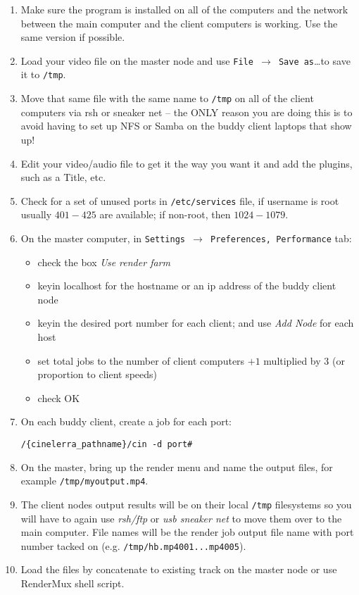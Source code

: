 \begin{enumerate}
\item Make sure the \CGG{} program is installed on all of the
  computers and the network between the main computer and the client
  computers is working.  Use the same version if possible.
\item Load your video file on the master node and use \texttt{File
    $\rightarrow$ Save as}\dots to save it to \texttt{/tmp}.
\item Move that same file with the same name to \texttt{/tmp} on all
  of the client computers via rsh or sneaker net -- the ONLY reason
  you are doing this is to avoid having to set up NFS or Samba on the
  buddy client laptops that show up!
\item Edit your video/audio file to get it the way you want it and
  add the plugins, such as a Title, etc.
\item Check for a set of unused ports in \texttt{/etc/services}
  file, if username is root usually $401-425$ are available; if
  non-root, then $1024-1079$.
\item On the master computer, in \texttt{Settings $\rightarrow$
    Preferences, Performance} tab:
  \begin{itemize}
  \item check the box \textit{Use render farm}
  \item keyin localhost for the hostname or an ip address of the
    buddy client node
  \item keyin the desired port number for each client; and use
    \textit{Add Node} for each host
  \item set total jobs to the number of client computers $+1$
    multiplied by $3$ (or proportion to client speeds)
  \item check OK
  \end{itemize}
\item On each buddy client, create a job for each port:
\begin{lstlisting}[style=sh]
/{cinelerra_pathname}/cin -d port#
\end{lstlisting}
\item On the master, bring up the render menu and name the output
  files, for example \texttt{/tmp/myoutput.mp4}.
\item The client nodes output results will be on their local
  \texttt{/tmp} filesystems so you will have to again use
  \textit{rsh/ftp} or \textit{usb sneaker net} to move them over to
  the main computer.  File names will be the render job output file
  name with port number tacked on
  (e.g. \texttt{/tmp/hb.mp4001...mp4005}).
\item Load the files by concatenate to existing track on the master
  node or use RenderMux shell script.
\end{enumerate}

